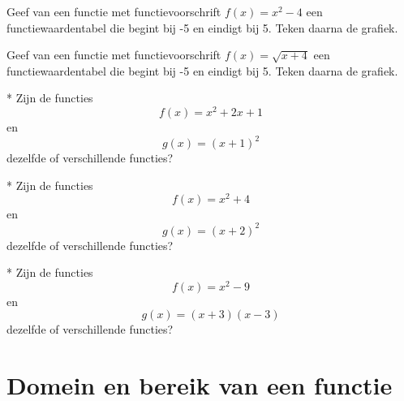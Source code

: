 \documentclass[12pt,twoside]{article}
\begin{document}
\begin{oefening}
  Geef van een functie met functievoorschrift $f(x)=x^2-4$ een functiewaardentabel die begint bij -5 en eindigt bij 5. Teken daarna de grafiek.
\end{oefening}

\begin{oefening}
  Geef van een functie met functievoorschrift $f(x)=\sqrt{x+4}$ een functiewaardentabel die begint bij -5 en eindigt bij 5. Teken daarna de grafiek.
\end{oefening}

\begin{oefening}*
  Zijn de functies
  $$f(x)=x^2+2x+1$$
  en
  $$g(x)=(x+1)^2$$
  dezelfde of verschillende functies?
\end{oefening}

\begin{oefening}*
  Zijn de functies
  $$f(x)=x^2+4$$
  en
  $$g(x)=(x+2)^2$$
  dezelfde of verschillende functies?
\end{oefening}

\begin{oefening}*
  Zijn de functies
  $$f(x)=x^2-9$$
  en
  $$g(x)=(x+3)(x-3)$$
  dezelfde of verschillende functies?
\end{oefening}


\newpage
\section{Domein en bereik van een functie}
\end{document}
